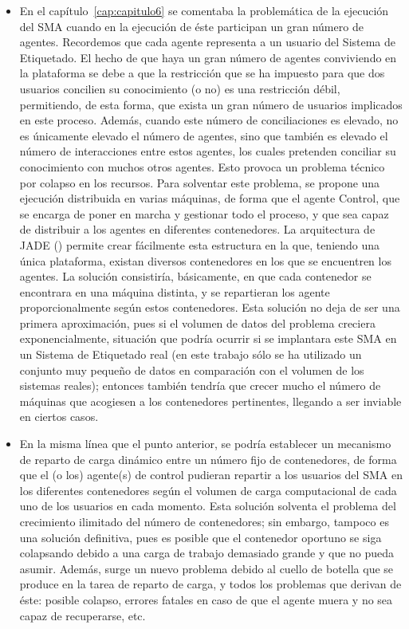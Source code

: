 \begin{itemize}

	\item En el capítulo~\ref{cap:capitulo6} se comentaba la problemática de la ejecución del SMA cuando en la ejecución de éste participan un gran número de agentes. Recordemos que cada agente representa a un usuario del Sistema de Etiquetado. El hecho de que haya un gran número de agentes conviviendo en la plataforma se debe a que la restricción que se ha impuesto para que dos usuarios concilien su conocimiento (o no) es una restricción débil, permitiendo, de esta forma, que exista un gran número de usuarios implicados en este proceso. Además, cuando este número de conciliaciones es elevado, no es únicamente elevado el número de agentes, sino que también es elevado el número de interacciones entre estos agentes, los cuales pretenden conciliar su conocimiento con muchos otros agentes. Esto provoca un problema técnico por colapso en los recursos. Para solventar este problema, se propone una ejecución distribuida en varias máquinas, de forma que el agente Control, que se encarga de poner en marcha y gestionar todo el proceso, y que sea capaz de distribuir a los agentes en diferentes contenedores. La arquitectura de JADE (\cite{jade}) permite crear fácilmente esta estructura en la que, teniendo una única plataforma, existan diversos contenedores en los que se encuentren los agentes. La solución consistiría, básicamente, en que cada contenedor se encontrara en una máquina distinta, y se repartieran los agente proporcionalmente según estos contenedores. Esta solución no deja de ser una primera aproximación, pues si el volumen de datos del problema creciera exponencialmente, situación que podría ocurrir si se implantara este SMA en un Sistema de Etiquetado real (en este trabajo sólo se ha utilizado un conjunto muy pequeño de datos en comparación con el volumen de los sistemas reales); entonces también tendría que crecer mucho el número de máquinas que acogiesen a los contenedores pertinentes, llegando a ser inviable en ciertos casos.

	\item En la misma línea que el punto anterior, se podría establecer un mecanismo de reparto de carga dinámico entre un número fijo de contenedores, de forma que el (o los) agente(s) de control pudieran repartir a los usuarios del SMA en los diferentes contenedores según el volumen de carga computacional de cada uno de los usuarios en cada momento. Esta solución solventa el problema del crecimiento ilimitado del número de contenedores; sin embargo, tampoco es una solución definitiva, pues es posible que el contenedor oportuno se siga colapsando debido a una carga de trabajo demasiado grande y que no pueda asumir. Además, surge un nuevo problema debido al cuello de botella que se produce en la tarea de reparto de carga, y todos los problemas que derivan de éste: posible colapso, errores fatales en caso de que el agente muera y no sea capaz de recuperarse, etc.


\end{itemize}
